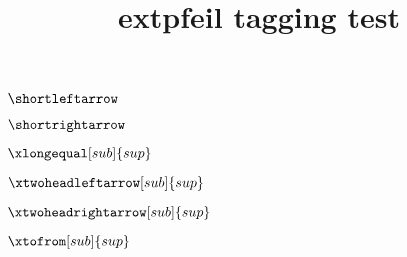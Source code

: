 \documentclass{article}
\title{extpfeil tagging test}
\begin{document}
$\shortleftarrow$

$\shortrightarrow$

$\xlongequal[sub]{sup}$

$\xtwoheadleftarrow[sub]{sup}$

$\xtwoheadrightarrow[sub]{sup}$

$\xtofrom[sub]{sup}$
\end{document}

